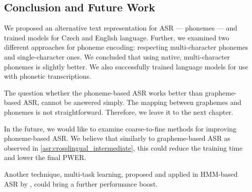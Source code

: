 \subsection{Conclusion and Future Work}
We proposed an alternative text representation for ASR --- phonemes --- and trained models for Czech and English language. Further, we examined two different approaches for phoneme encoding: respecting multi-character phonemes and single-character ones. We concluded that using native, multi-character phonemes is slightly better. We also successfully trained language models for use with phonetic transcriptions. 

The question whether the phoneme-based ASR works better than grapheme-based ASR, cannot be answered simply. The mapping between graphemes and phonemes is not straightforward. Therefore, we leave it to the next chapter.

In the future, we would like to examine coarse-to-fine methods for improving phoneme-based ASR. We believe that similarly to grapheme-based ASR as observed in \cref{asr:crosslingual_intermediate}, this could reduce the training time and lower the final PWER. 

Another technique, multi-task learning, proposed and applied in HMM-based ASR by , could bring a further performance boost. 


